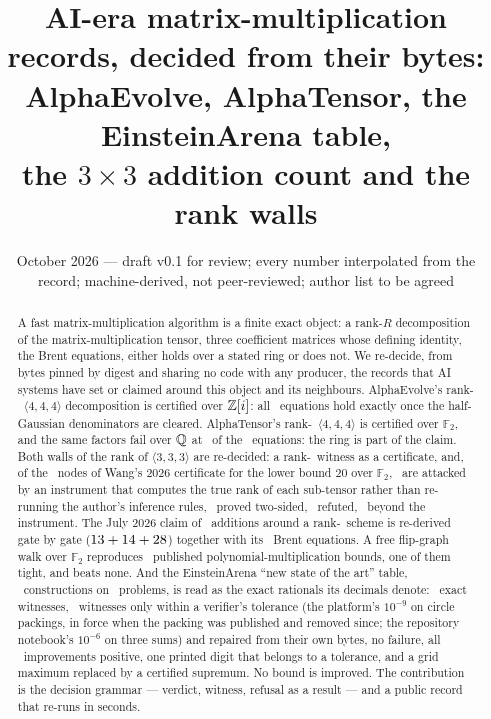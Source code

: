 \documentclass[11pt]{article}
\title{AI-era matrix-multiplication records, decided from their bytes:\\
AlphaEvolve, AlphaTensor, the EinsteinArena table,\\
the $3\times3$ addition count and the rank walls}
\author{\cmauthor}
\date{October 2026 --- draft v0.1 for review; every number interpolated from the record; machine-derived, not peer-reviewed; author list to be agreed}
\newcommand{\F}{\mathbb{F}}
\newcommand{\mm}[3]{\langle #1,#2,#3\rangle}
\begin{document}
\maketitle

\begin{abstract}
A fast matrix-multiplication algorithm is a finite exact object: a rank-$R$ decomposition of the
matrix-multiplication tensor, three coefficient matrices whose defining identity, the Brent equations,
either holds over a stated ring or does not. We re-decide, from bytes pinned by digest and sharing no code
with any producer, the records that AI systems have set or claimed around this object and its neighbours.
AlphaEvolve's rank-\AERank\ $\mm444$ decomposition is certified over $\mathbb{Z}[i]$: all \AEEquations\ equations
hold exactly once the half-Gaussian denominators are cleared. AlphaTensor's rank-\ATRank\ $\mm444$ is
certified over $\F_2$, and the same factors fail over $\mathbb{Q}$ at \ATQFailCount\ of the \ATEquations\ equations:
the ring is part of the claim. Both walls of the rank of $\mm333$ are re-decided: a rank-\LadermanRank\
witness as a certificate, and, of the \LBNodes\ nodes of Wang's 2026 certificate for the lower bound $20$
over $\F_2$, \LBAttacked\ are attacked by an instrument that computes the true rank of each sub-tensor
rather than re-running the author's inference rules, \LBConfirmed\ proved two-sided, \LBRefuted\ refuted,
\LBNotAttacked\ beyond the instrument. The July 2026 claim of \AddCounted\ additions around a rank-\AddRank\
scheme is re-derived gate by gate ($13+14+28$) together with its \AddBrent\ Brent equations. A free
flip-graph walk over $\F_2$ reproduces \BLMatch\ published polynomial-multiplication bounds, one of them
tight, and beats none. And the EinsteinArena ``new state of the art'' table, \EARows\ constructions on
\EAProblems\ problems, is read as the exact rationals its decimals denote: \EAWitnessed\ exact witnesses,
\EARepaired\ witnesses only within a verifier's tolerance (the platform's $10^{-9}$ on circle packings, in force when
the packing was published and removed since; the repository notebook's $10^{-6}$ on three sums) and repaired from
their own bytes, no failure, all \EAImprovements\ improvements positive, one printed digit that belongs to a
tolerance, and a grid maximum replaced by a certified supremum. No bound
is improved. The contribution is the decision grammar --- verdict, witness, refusal as a result --- and a
public record that re-runs in seconds.
\end{abstract}
\end{document}
